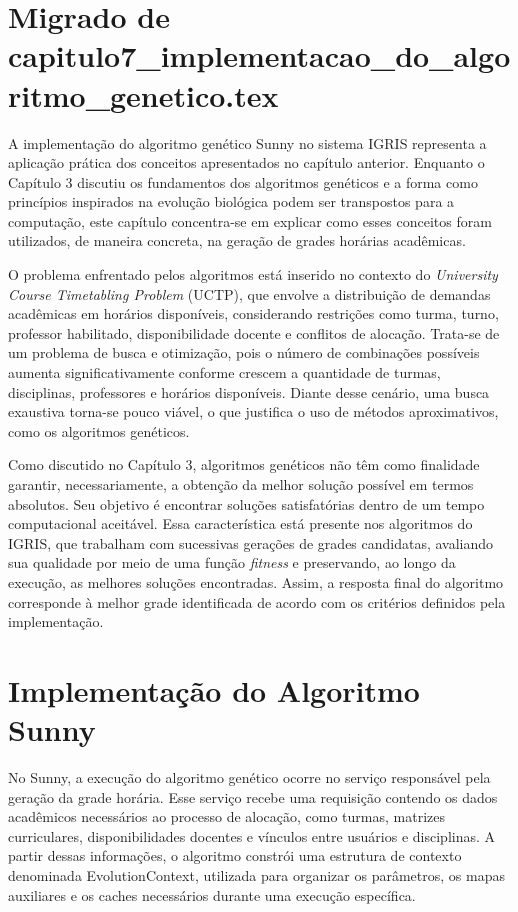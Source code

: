 \section{Migrado de capitulo7\_implementacao\_do\_algoritmo\_genetico.tex}

A implementação do algoritmo genético Sunny no sistema IGRIS representa a aplicação prática dos conceitos apresentados no capítulo anterior. Enquanto o Capítulo 3 discutiu os fundamentos dos algoritmos genéticos e a forma como princípios inspirados na evolução biológica podem ser transpostos para a computação, este capítulo concentra-se em explicar como esses conceitos foram utilizados, de maneira concreta, na geração de grades horárias acadêmicas.

O problema enfrentado pelos algoritmos está inserido no contexto do \textit{University Course Timetabling Problem} (UCTP), que envolve a distribuição de demandas acadêmicas em horários disponíveis, considerando restrições como turma, turno, professor habilitado, disponibilidade docente e conflitos de alocação. Trata-se de um problema de busca e otimização, pois o número de combinações possíveis aumenta significativamente conforme crescem a quantidade de turmas, disciplinas, professores e horários disponíveis. Diante desse cenário, uma busca exaustiva torna-se pouco viável, o que justifica o uso de métodos aproximativos, como os algoritmos genéticos.

Como discutido no Capítulo 3, algoritmos genéticos não têm como finalidade garantir, necessariamente, a obtenção da melhor solução possível em termos absolutos. Seu objetivo é encontrar soluções satisfatórias dentro de um tempo computacional aceitável. Essa característica está presente nos algoritmos do IGRIS, que trabalham com sucessivas gerações de grades candidatas, avaliando sua qualidade por meio de uma função \textit{fitness} e preservando, ao longo da execução, as melhores soluções encontradas. Assim, a resposta final do algoritmo corresponde à melhor grade identificada de acordo com os critérios definidos pela implementação.

\section{Implementação do Algoritmo Sunny}
\label{sec:7.1}

No Sunny, a execução do algoritmo genético ocorre no serviço responsável pela geração da grade horária. Esse serviço recebe uma requisição contendo os dados acadêmicos necessários ao processo de alocação, como turmas, matrizes curriculares, disponibilidades docentes e vínculos entre usuários e disciplinas. A partir dessas informações, o algoritmo constrói uma estrutura de contexto denominada EvolutionContext, utilizada para organizar os parâmetros, os mapas auxiliares e os caches necessários durante uma execução específica.


